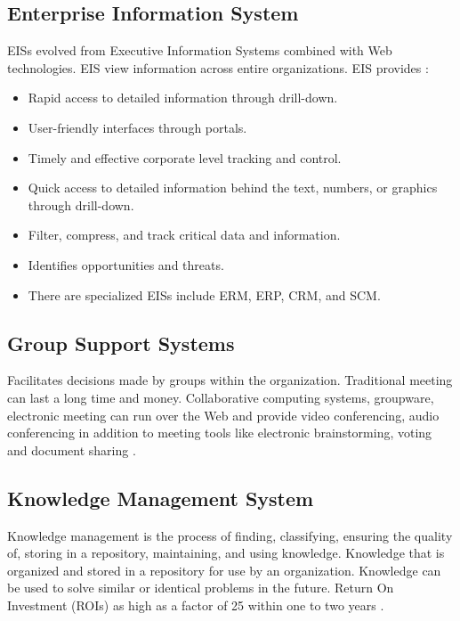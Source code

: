 \documentclass[12pt,a4paper,final,twoside,onecolumn,titlepage]{book}
\begin{document}
\subsection{Enterprise Information System}
\gls{EIS}s evolved from Executive Information Systems combined with Web technologies. \gls{EIS} view information across entire organizations. \gls{EIS} provides \cite{MNAS02}:
\begin{itemize}
\item Rapid access to detailed information through drill-down.
\item User-friendly interfaces through portals.
\item Timely and effective corporate level tracking and control.
\item Quick access to detailed information behind the text, numbers, or graphics through drill-down.
\item Filter, compress, and track critical data and information.
\item Identifies opportunities and threats.
\item There are specialized \gls{EIS}s include \gls{ERM}, \gls{ERP}, \gls{CRM}, and \gls{SCM}.
\end{itemize}

\subsection{Group Support Systems}
Facilitates decisions made by groups within the organization. Traditional meeting can last a long time and money. Collaborative computing systems, groupware, electronic meeting can run over the Web and provide video conferencing, audio conferencing in addition to meeting tools like electronic brainstorming, voting and document sharing \cite{MNAS02}.

\subsection{Knowledge Management System}
Knowledge management is the process of finding, classifying, ensuring the quality of, storing in a repository, maintaining, and using knowledge. Knowledge that is organized and stored in a repository for use by an organization. Knowledge can be used to solve similar or identical problems in the future. Return On Investment (ROIs) as high as a factor of 25 within one to two years 
\cite{MNAS02}.
\end{document}
